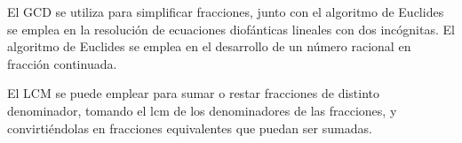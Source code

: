 El GCD se utiliza para simplificar fracciones, junto con el algoritmo de Euclides se emplea en la resolución de ecuaciones diofánticas lineales con dos incógnitas. El algoritmo de Euclides se emplea en el desarrollo de un número racional en fracción continuada.

El LCM se puede emplear para sumar o restar fracciones de distinto denominador, tomando el lcm de los denominadores de las fracciones, y convirtiéndolas en fracciones equivalentes que puedan ser sumadas. 